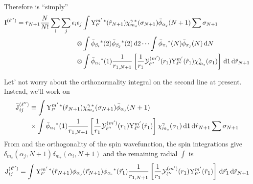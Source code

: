 \documentclass[aps,pra,groupedaddress,12pt,
               amsfonts,amssymb,
               preprint
    ]{revtex4}
\begin{document}
Therefore  is ``simply''
\begin{equation}
  \label{eq:Iexlla}
  \begin{split}
    \mathrm{I}^{(\ell'')} = r_{N+1}\dfrac{N}{N!}\sum_i\sum_j\epsilon_i\epsilon_j 
           & \int\mathrm{Y}_{\ell'}^{m'\,*}(\hat{r}_{N+1})\chi_{m_s}^{\gamma\,*}(\sigma_{N+1})\bar{\phi}_{\alpha_j}(N+1)\sum\sigma_{N+1} \\
   \otimes & \int\bar{\phi}_{\beta_i}{}^*(2)\bar{\phi}_{\beta_j}{}^*(2)\,\mathrm{d} 2\cdots\int\bar{\phi}_{\pi_i}{}^*(N)\bar{\phi}_{\pi_j}(N)\,\mathrm{d} N \\
   \otimes & \int\bar{\phi}_{\alpha_i}{}^*(1)\dfrac{1}{r_{1,N+1}}\left[\dfrac{1}{r_1}\mathcal{Y}_{\ell''}^{(m')}(r_1)\mathrm{Y}_{\ell''}^{m'}(\hat{r}_1)\chi_{m_s}^{\gamma}(\sigma_1)\right]\,\mathrm{d} 1\,\mathrm{d}\hat{r}_{N+1}
  \end{split}
\end{equation}

Let' not worry about the orthonormality integral on the second line at
present. Instead, we'll work on 
\begin{equation}
  \label{eq:Iexllb}
  \begin{split}
  \bar{\mathrm{J}}_{ij}^{(\ell'')} & \equiv
  \int\mathrm{Y}_{\ell'}^{m'\,*}(\hat{r}_{N+1})\chi_{m_s}^{\gamma\,*}(\sigma_{N+1})\bar{\phi}_{\alpha_j}(N+1) \\
  &\times\int\bar{\phi}_{\alpha_i}{}^*(1)\dfrac{1}{r_{1,N+1}}\left[\dfrac{1}{r_1}\mathcal{Y}_{\ell''}^{(m')}(r_1)\mathrm{Y}_{\ell''}^{m'}(\hat{r}_1)\right]\chi_{m_s}^{\gamma}(\sigma_1)\,\mathrm{d} 1\,\mathrm{d}\hat{r}_{N+1}\sum\sigma_{N+1} 
  \end{split}
\end{equation}
From  and the orthogonality of the spin wavefunction, the spin
integrations give $\delta_{m_s}(\alpha_j,N+1)\delta_{m_s}(\alpha_i,N+1)$
and the remaining radial $\int$ is
\begin{equation}
  \label{eq:Iexllc}
  \mathrm{J}_{ij}^{(\ell'')} =
  \int\mathrm{Y}_{\ell'}^{m'\,*}(\hat{r}_{N+1})\phi_{\alpha_j}(\vec{r}_{N+1})\phi_{\alpha_i}{}^*(\vec{r}_1)\dfrac{1}{r_{1,N+1}}\left[\dfrac{1}{r_1}\mathcal{Y}_{\ell''}^{(m')}(r_1)\mathrm{Y}_{\ell''}^{m'}(\hat{r}_1)\right]\,\mathrm{d}\vec{r}_1\,\mathrm{d}\hat{r}_{N+1}
\end{equation}
\end{document}
